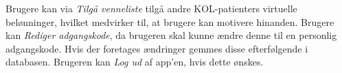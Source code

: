 Brugere kan via \textit{Tilgå venneliste} tilgå andre KOL-patienters virtuelle belønninger, hvilket medvirker til, at brugere kan motivere hinanden. Brugere kan \textit{Rediger adgangskode}, da brugeren skal kunne ændre denne til en personlig adgangskode. Hvis der foretages ændringer gemmes disse efterfølgende i databasen.
Brugeren kan \textit{Log ud} af app'en, hvis dette ønskes. 

%
%
%
%
